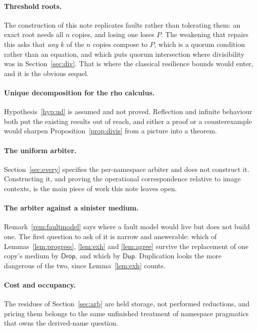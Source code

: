 \documentclass[11pt]{article}
\theoremstyle{definition}
\newcommand{\rhoc}{rho calculus}
\begin{document}
\paragraph{Threshold roots.} The construction of this note replicates faults rather than tolerating them: an exact root needs all $n$ copies, and losing one loses $P$. The weakening that repairs this asks that \emph{any $k$} of the $n$ copies compose to $P$, which is a quorum condition rather than an equation, and which puts quorum intersection where divisibility was in Section~\ref{sec:div}. That is where the classical resilience bounds would enter, and it is the obvious sequel.

\paragraph{Unique decomposition for the \rhoc{}.} Hypothesis~\ref{hyp:ud} is assumed and not proved. Reflection and infinite behaviour both put the existing results out of reach, and either a proof or a counterexample would sharpen Proposition~\ref{prop:divis} from a picture into a theorem.

\paragraph{The uniform arbiter.} Section~\ref{sec:every} specifies the per-namespace arbiter and does not construct it. Constructing it, and proving the operational correspondence relative to image contexts, is the main piece of work this note leaves open.

\paragraph{The arbiter against a sinister medium.} Remark~\ref{rem:faultmodel} says where a fault model would live but does not build one. The first question to ask of it is narrow and answerable: which of Lemmas~\ref{lem:progress}, \ref{lem:exh} and \ref{lem:agree} survive the replacement of one copy's medium by $\mathsf{Drop}$, and which by $\mathsf{Dup}$. Duplication looks the more dangerous of the two, since Lemma~\ref{lem:exh} counts.

\paragraph{Cost and occupancy.} The residues of Section~\ref{sec:arb} are held storage, not performed reductions, and pricing them belongs to the same unfinished treatment of namespace pragmatics that owns the derived-name question.
\end{document}
